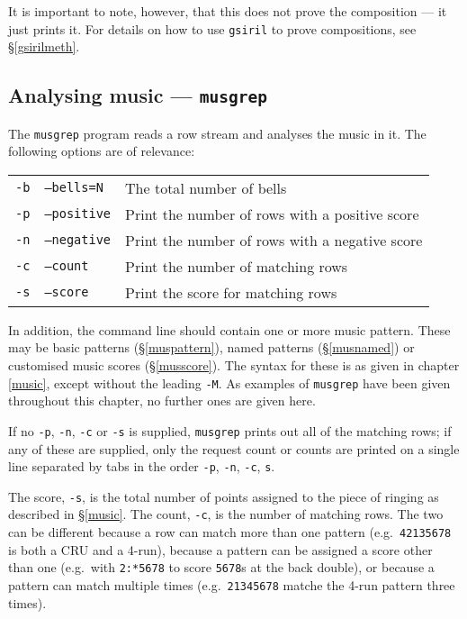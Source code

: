 \documentclass[a4paper,11pt,oneside]{book}
\makeatletter
\newcommand{\ttcmdidx}[1]{\texttt{#1}\index{#1@{\texttt{#1}}}}
\newcommand{\sref}[1]{\hyperref[#1]{\S\ref{#1}}}
\makeatother
\begin{document}
It is important to note, however, that this does not prove the composition
--- it just prints it.  For details on how to use \texttt{gsiril} to 
prove compositions, see \sref{gsirilmeth}.

\subsection{Analysing music — \texttt{musgrep}}\label{musgrep}

The \ttcmdidx{musgrep} program reads a row stream and analyses the
music in it.  The following options are of relevance:

\begin{tabularx}{\textwidth}{llX}
\texttt{-b}&\texttt{--bells=N}&The total number of bells\\
\texttt{-p}&\texttt{--positive}
   &Print the number of rows with a positive score\\
\texttt{-n}&\texttt{--negative}
  &Print the number of rows with a negative score\\
\texttt{-c}&\texttt{--count}&Print the number of matching rows\\
\texttt{-s}&\texttt{--score}&Print the score for matching rows\\
\end{tabularx}

In addition, the command line should contain one or more music pattern.
These may be basic patterns (\sref{muspattern}), named patterns 
(\sref{musnamed}) or customised music scores (\sref{musscore}). 
The syntax for these is as given in chapter \ref{music},
except without the leading \verb+-M+.  As examples of \texttt{musgrep}
have been given throughout this chapter, no further ones are given here.

If no \verb+-p+, \verb+-n+, \verb+-c+ or \verb+-s+ is supplied, 
\texttt{musgrep} prints out all of the matching rows; 
if any of these are supplied, only the request count or counts are printed 
on a single line separated by tabs in the order 
\verb+-p+, \verb+-n+, \verb+-c+, \verb+s+.

The score, \verb+-s+, is the total number of points assigned to the piece
of ringing as described in \sref{music}.  The count, \verb+-c+, is the 
number of matching rows.  The two can be different because a row can match
more than one pattern (e.g.\ \verb+42135678+ is both a CRU and a 4-run), 
because a pattern can be assigned a score other than one 
(e.g.\ with \verb+2:*5678+ to score \verb+5678+s at the back double),
or because a pattern can match multiple times (e.g.\ \verb+21345678+ matche
the 4-run pattern three times).
\end{document}

